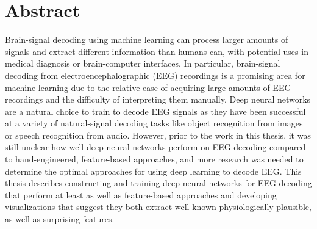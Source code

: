 \begingroup
\let\clearpage\relax
\let\cleardoublepage\relax
\let\cleardoublepage\relax

\chapter*{Abstract}
Brain-signal decoding using machine learning can process larger amounts of signals and extract different information than humans can, with potential uses in medical diagnosis or brain-computer interfaces. In particular, brain-signal decoding from electroencephalographic (EEG) recordings is a promising area for machine learning due to the relative ease of acquiring large amounts of EEG recordings and the difficulty of interpreting them manually. Deep neural networks are a natural choice to train to decode EEG signals as they have been successful at a variety of natural-signal decoding tasks like object recognition from images or speech recognition from audio. However, prior to the work in this thesis, it was still unclear how well deep neural networks perform on EEG decoding compared to hand-engineered, feature-based approaches, and more research was needed to determine the optimal approaches for using deep learning to decode EEG. This thesis describes constructing and training deep neural networks for EEG decoding that perform at least as well as feature-based approaches and developing visualizations that suggest they both extract well-known physiologically plausible, as well as surprising features.

\vfill
\clearpage
\newpage

